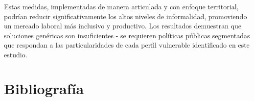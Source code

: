 \documentclass[Royal,times,sageh]{sagej}
\begin{document}
Estas medidas, implementadas de manera articulada y con enfoque
territorial, podrían reducir significativamente los altos niveles de
informalidad, promoviendo un mercado laboral más inclusivo y productivo.
Los resultados demuestran que soluciones genéricas son insuficientes -
se requieren políticas públicas segmentadas que respondan a las
particularidades de cada perfil vulnerable identificado en este estudio.

\section{Bibliografía}\label{bibliografuxeda}

\nocite{*}



\end{document}
